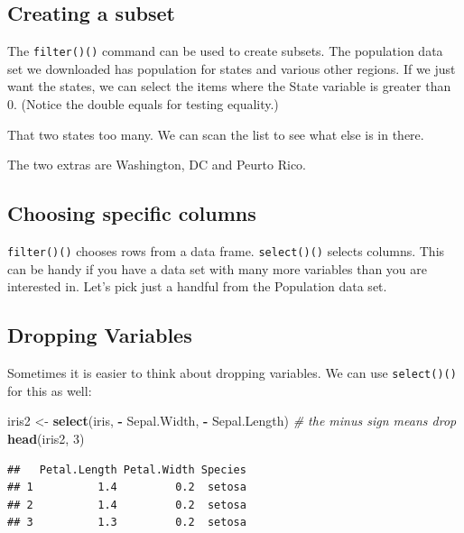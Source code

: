 \documentclass[]{book}
\newenvironment{Shaded}{\begin{snugshade}}{\end{snugshade}}
\newcommand{\CommentTok}[1]{\textcolor[rgb]{0.56,0.35,0.01}{\textit{#1}}}
\newcommand{\DecValTok}[1]{\textcolor[rgb]{0.00,0.00,0.81}{#1}}
\newcommand{\KeywordTok}[1]{\textcolor[rgb]{0.13,0.29,0.53}{\textbf{#1}}}
\newcommand{\NormalTok}[1]{#1}
\newcommand{\OperatorTok}[1]{\textcolor[rgb]{0.81,0.36,0.00}{\textbf{#1}}}
\newcommand{\StringTok}[1]{\textcolor[rgb]{0.31,0.60,0.02}{#1}}
\begin{document}
\hypertarget{creating-a-subset}{%
\subsection{Creating a subset}\label{creating-a-subset}}

The \texttt{filter()()} command can be used to create subsets. The population
data set we downloaded has population for states and various other regions. If we
just want the states, we can select the items where the {State} variable is
greater than 0. (Notice the double equals for testing equality.)

That two states too many. We can scan the list to see what else is in there.

The two extras are Washington, DC and Peurto Rico.

\hypertarget{choosing-specific-columns}{%
\subsection{Choosing specific columns}\label{choosing-specific-columns}}

\texttt{filter()()} chooses rows from a data frame. \texttt{select()()} selects
columns. This can be handy if you have a data set with many more variables than you are interested in. Let's pick just a handful from the {Population} data
set.

\hypertarget{dropping-variables}{%
\subsection{Dropping Variables}\label{dropping-variables}}

Sometimes it is easier to think about dropping variables.
We can use \texttt{select()()} for this as well:

\begin{Shaded}
\begin{Highlighting}[]
\NormalTok{iris2 <-}\StringTok{ }\KeywordTok{select}\NormalTok{(iris, }\OperatorTok{-}\StringTok{ }\NormalTok{Sepal.Width, }\OperatorTok{-}\StringTok{ }\NormalTok{Sepal.Length)  }\CommentTok{# the minus sign means drop }
\KeywordTok{head}\NormalTok{(iris2, }\DecValTok{3}\NormalTok{)}
\end{Highlighting}
\end{Shaded}

\begin{verbatim}
##   Petal.Length Petal.Width Species
## 1          1.4         0.2  setosa
## 2          1.4         0.2  setosa
## 3          1.3         0.2  setosa
\end{verbatim}
\end{document}
